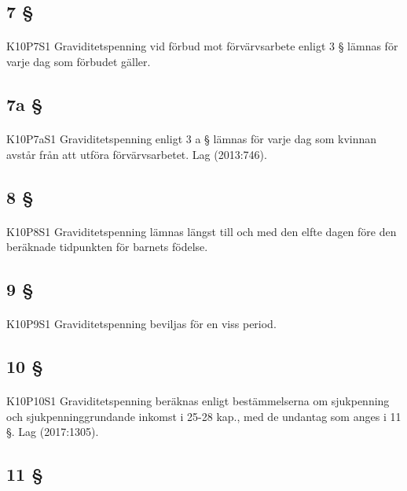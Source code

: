 \documentclass[a4paper,notitlepage,openany,10pt]{book}
\begin{document}
\subsection*{7 §}
\paragraph*{}
{\tiny K10P7S1}
Graviditetspenning vid förbud mot förvärvsarbete enligt 3 § lämnas för varje dag som förbudet gäller.
\subsection*{7a §}
\paragraph*{}
{\tiny K10P7aS1}
Graviditetspenning enligt 3 a § lämnas för varje dag som kvinnan avstår från att utföra förvärvsarbetet.
Lag (2013:746).
\subsection*{8 §}
\paragraph*{}
{\tiny K10P8S1}
Graviditetspenning lämnas längst till och med den elfte dagen före den beräknade tidpunkten för barnets födelse.
\subsection*{9 §}
\paragraph*{}
{\tiny K10P9S1}
Graviditetspenning beviljas för en viss period.
\subsection*{10 §}
\paragraph*{}
{\tiny K10P10S1}
Graviditetspenning beräknas enligt bestämmelserna om sjukpenning och sjukpenninggrundande inkomst i 25-28 kap., med de undantag som anges i 11 §.
Lag (2017:1305).
\subsection*{11 §}
\end{document}
